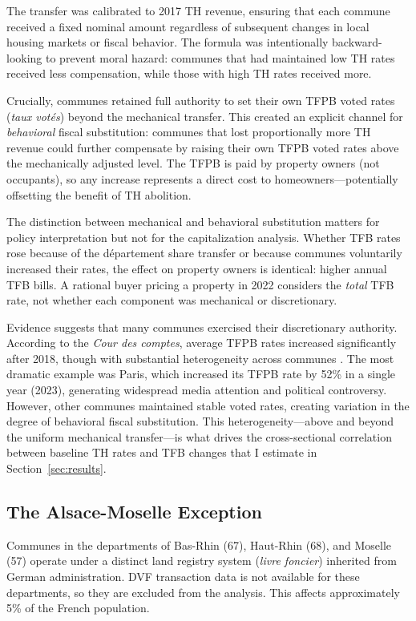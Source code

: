 \documentclass[12pt]{article}
\begin{document}
The transfer was calibrated to 2017 TH revenue, ensuring that each commune received a fixed nominal amount regardless of subsequent changes in local housing markets or fiscal behavior. The formula was intentionally backward-looking to prevent moral hazard: communes that had maintained low TH rates received less compensation, while those with high TH rates received more.

Crucially, communes retained full authority to set their own TFPB voted rates (\emph{taux vot\'es}) beyond the mechanical transfer. This created an explicit channel for \emph{behavioral} fiscal substitution: communes that lost proportionally more TH revenue could further compensate by raising their own TFPB voted rates above the mechanically adjusted level. The TFPB is paid by property owners (not occupants), so any increase represents a direct cost to homeowners---potentially offsetting the benefit of TH abolition.

The distinction between mechanical and behavioral substitution matters for policy interpretation but not for the capitalization analysis. Whether TFB rates rose because of the d\'epartement share transfer or because communes voluntarily increased their rates, the effect on property owners is identical: higher annual TFB bills. A rational buyer pricing a property in 2022 considers the \emph{total} TFB rate, not whether each component was mechanical or discretionary.

Evidence suggests that many communes exercised their discretionary authority. According to the \emph{Cour des comptes}, average TFPB rates increased significantly after 2018, though with substantial heterogeneity across communes \citep{cour2021}. The most dramatic example was Paris, which increased its TFPB rate by 52\% in a single year (2023), generating widespread media attention and political controversy. However, other communes maintained stable voted rates, creating variation in the degree of behavioral fiscal substitution. This heterogeneity---above and beyond the uniform mechanical transfer---is what drives the cross-sectional correlation between baseline TH rates and TFB changes that I estimate in Section~\ref{sec:results}.\label{sec:fiscal_comp}

\subsection{The Alsace-Moselle Exception}

Communes in the departments of Bas-Rhin (67), Haut-Rhin (68), and Moselle (57) operate under a distinct land registry system (\emph{livre foncier}) inherited from German administration. DVF transaction data is not available for these departments, so they are excluded from the analysis. This affects approximately 5\% of the French population.
\end{document}
